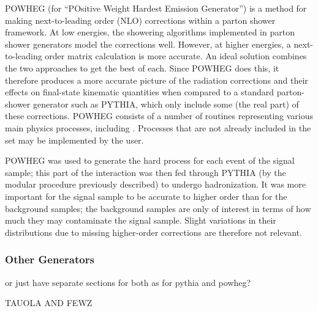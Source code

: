 
POWHEG (for ``POsitive Weight Hardest Emission Generator'') 
is a method for making next-to-leading order (NLO) 
corrections within a parton shower framework.  
At low energies, the showering algorithms implemented 
in parton shower generators 
model the corrections well.  
However, at higher energies, a next-to-leading order 
matrix calculation is more accurate.  
An ideal solution combines the two approaches 
to get the best of each.  
Since POWHEG does this, 
it therefore produces a more accurate picture 
of the radiation corrections and their effects 
on final-state kinematic quantities 
when compared to a standard parton-shower 
generator such as PYTHIA, 
which only include some (the real part) 
of these corrections.  
POWHEG consists of a number of routines representing 
various main physics processes, 
including \Zee.  
Processes that are not already included 
in the set may be implemented by the user.  

POWHEG was used to generate the 
hard process for each event 
of the \Zee signal sample; 
this part of the interaction was then 
fed through PYTHIA 
(by the modular procedure previously described) 
to undergo hadronization.  
It was more important for the signal 
sample to be accurate to higher order 
than for the background samples; 
the background samples are only of interest 
in terms of how much they may contaminate 
the signal sample.  
Slight variations in their distributions 
due to missing higher-order corrections are 
therefore not relevant.  



\subsubsection{Other Generators}
\label{sim:MCGensOther}

or just have separate sections for both as for pythia and powheg?  

TAUOLA AND FEWZ




